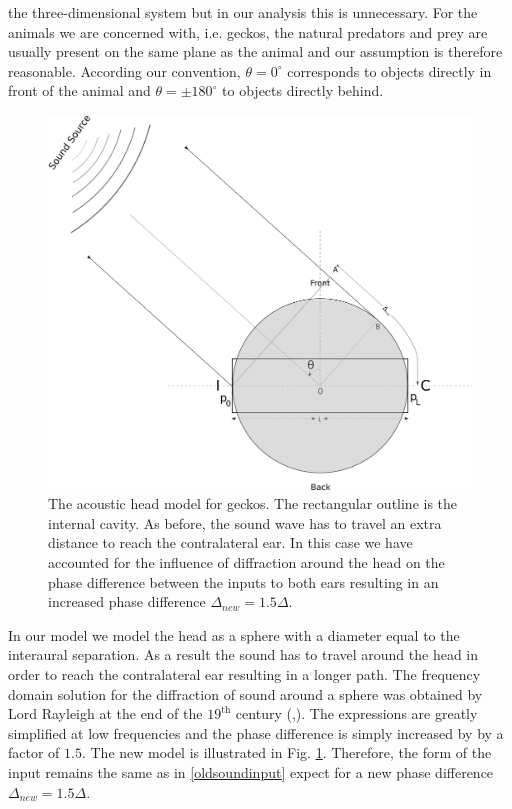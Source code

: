 the three-dimensional system but in our analysis this is unnecessary. For the animals we are concerned with, i.e. geckos, the natural
predators and prey are usually present on the same plane as the animal and our assumption is therefore reasonable. According our convention,
$\theta=0^\circ$ corresponds to objects directly in front of the animal and $\theta=\pm180^\circ$ to objects directly behind.
\begin{figure}[ht]
 \includegraphics[width=.75\linewidth]{Diagrams/acousticheadmodel2.png}
 \caption[New acoustic head model for geckos]{The acoustic head model for geckos. The rectangular outline 
 is the internal cavity. As before, the sound wave has to travel an extra distance to reach the contralateral ear. 
 In this case we have accounted for the influence of diffraction around the head on the phase difference between the inputs
 to both ears resulting in an increased phase difference $\Delta_{new}=1.5\Delta$.}
 \label{newheadmodel}
\end{figure}
In our model we model the head as a sphere with a diameter equal to the interaural separation. As a result the sound has to travel around the 
head in order to reach the contralateral ear resulting in a longer path. The frequency domain solution for the diffraction of sound around a
sphere was obtained by Lord Rayleigh at the end of the $19^{\mbox{th}}$ century (\cite{rayleigh1},\cite{rayleigh2}). The expressions 
are greatly simplified at low frequencies and the phase difference is simply increased by by a factor of $1.5$. The new model is illustrated in Fig. \ref{newheadmodel}.
Therefore, the form of the input remains the same as in \eqref{oldsoundinput} expect for a new phase difference  $\Delta_{new}=1.5\Delta$.


